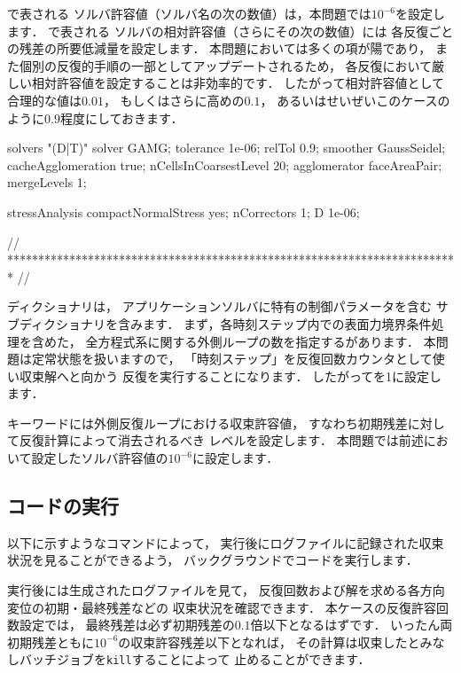 で表される
ソルバ許容値（ソルバ名の次の数値）は，本問題では$10^{-6}$を設定します．
%
%
で表される
ソルバの相対許容値（さらにその次の数値）には
各反復ごとの残差の所要低減量を設定します．
本問題においては多くの項が陽であり，
また個別の反復的手順の一部としてアップデートされるため，
各反復において厳しい相対許容値を設定することは非効率的です．
したがって相対許容値として合理的な値は$0.01$，
もしくはさらに高めの$0.1$，
あるいはせいぜいこのケースのように$0.9$程度にしておきます．
\begin{OFverbatim}[file, linenum=17]

solvers
{
    "(D|T)"
    {
        solver          GAMG;
        tolerance       1e-06;
        relTol          0.9;
        smoother        GaussSeidel;
        cacheAgglomeration true;
        nCellsInCoarsestLevel 20;
        agglomerator    faceAreaPair;
        mergeLevels     1;
    }
}

stressAnalysis
{
    compactNormalStress yes;
    nCorrectors     1;
    D               1e-06;
}


// ************************************************************************* //
\end{OFverbatim}
ディクショナリは，
アプリケーションソルバに特有の制御パラメータを含む
サブディクショナリを含みます．
まず，各時刻ステップ内での表面力境界条件処理を含めた，
全方程式系に関する外側ループの数を指定するがあります．
本問題は定常状態を扱いますので，
「時刻ステップ」を反復回数カウンタとして使い収束解へと向かう
反復を実行することになります．
したがってを1に設定します．

キーワードには外側反復ループにおける収束許容値，
すなわち初期残差に対して反復計算によって消去されるべき
レベルを設定します．
本問題では前述において設定したソルバ許容値の$10^{-6}$に設定します．


\subsection{コードの実行}
\label{ssec:2.2.2}
以下に示すようなコマンドによって，
実行後にログファイルに記録された収束状況を見ることができるよう，
バックグラウンドでコードを実行します．
実行後には生成されたログファイルを見て，
反復回数および解を求める各方向変位の初期・最終残差などの
収束状況を確認できます．
本ケースの反復許容回数設定では，
最終残差は必ず初期残差の$0.1$倍以下となるはずです．
いったん両初期残差ともに$10^{-6}$の収束許容残差以下となれば，
その計算は収束したとみなしバッチジョブを\texttt{kill}することによって
止めることができます．


